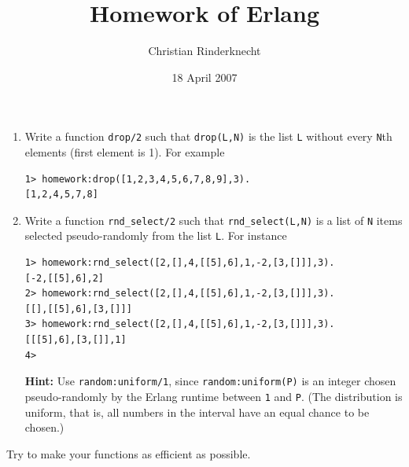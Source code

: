 \documentclass[11pt,a4paper]{article}
\title{Homework of Erlang}
\author{Christian Rinderknecht}
\date{18 April 2007}
\newcommand\Erlang{\textsf{Erlang}\xspace}
\begin{document}
\maketitle

\thispagestyle{empty}

\begin{enumerate}

  \item Write a function \texttt{drop/2} such that \texttt{drop(L,N)}
    is the list \texttt{L} without every \texttt{N}th elements (first
    element is 1). For example
{\small
\begin{verbatim}
1> homework:drop([1,2,3,4,5,6,7,8,9],3).
[1,2,4,5,7,8]
\end{verbatim}
}

  \item Write a function \texttt{rnd\_select/2} such that
    \texttt{rnd\_select(L,N)} is a list of \texttt{N} items selected
    pseudo-randomly from the list \texttt{L}. For instance
{\small
\begin{verbatim}
1> homework:rnd_select([2,[],4,[[5],6],1,-2,[3,[]]],3).
[-2,[[5],6],2]
2> homework:rnd_select([2,[],4,[[5],6],1,-2,[3,[]]],3).
[[],[[5],6],[3,[]]]
3> homework:rnd_select([2,[],4,[[5],6],1,-2,[3,[]]],3).
[[[5],6],[3,[]],1]
4>
\end{verbatim}
}

\textbf{Hint:} Use \texttt{random:uniform/1}, since
\texttt{random:uniform(P)} is an integer chosen pseudo-randomly by the
\Erlang runtime between \texttt{1} and \texttt{P}. (The distribution
is uniform, that is, all numbers in the interval have an equal chance
to be chosen.)
\end{enumerate}

Try to make your functions as efficient as possible.
\end{document}
